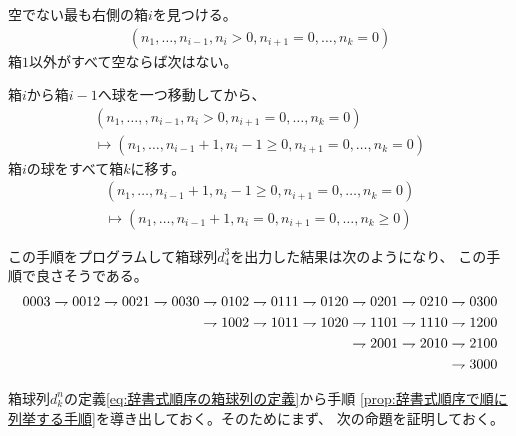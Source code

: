 	\begin{proposition}[辞書式順序で順に列挙する手順]
	\label{prop:辞書式順序で順に列挙する手順} %
		\begin{description}\setlength{\itemsep}{-1mm} %
			\item[空でない箱を探す] 空でない最も右側の箱$i$を見つける。
			\begin{equation*}\begin{split} %
				(n_1,\dots,n_{i-1},n_i>0, n_{i+1}=0,\dots,n_k=0)
			\end{split}\end{equation*} %
			箱$1$以外がすべて空ならば次はない。
			\item[球を移動する] 箱$i$から箱$i-1$へ球を一つ移動してから、
			\begin{equation*}\begin{split} %
				(n_1,\dots,,n_{i-1},n_i>0, n_{i+1}=0,\dots,n_k=0) \\
				\mapsto
				(n_1,\dots,n_{i-1}+1,n_i-1\ge0, n_{i+1}=0,\dots,n_k=0)
			\end{split}\end{equation*} %
			箱$i$の球をすべて箱$k$に移す。
			\begin{equation*}\begin{split} %
				(n_1,\dots,n_{i-1}+1,n_i-1\ge0, n_{i+1}=0,\dots,n_k=0) \\
				\mapsto
				(n_1,\dots,n_{i-1}+1,n_i=0, n_{i+1}=0,\dots,n_k\ge0)
			\end{split}\end{equation*} %
		\end{description} %
	\end{proposition} %

	この手順をプログラムして箱球列$d_4^3$を出力した結果は次のようになり、
	この手順で良さそうである。
	\begin{equation*}\begin{split} %
		0003 \tugi 0012 \tugi 0021 \tugi 0030 \tugi 0102 \tugi 0111 \tugi
		0120 \tugi 0201 \tugi 0210 \tugi 0300 \\
		\tugi 1002 \tugi 1011 \tugi 1020 \tugi 1101 \tugi 1110 \tugi 1200 \\
		\tugi 2001 \tugi 2010 \tugi 2100 \\
		\tugi 3000 \\
	\end{split}\end{equation*} %

	箱球列$d_k^n$の定義\eqref{eq:辞書式順序の箱球列の定義}から手順
	\ref{prop:辞書式順序で順に列挙する手順}を導き出しておく。そのためにまず、
	次の命題を証明しておく。

